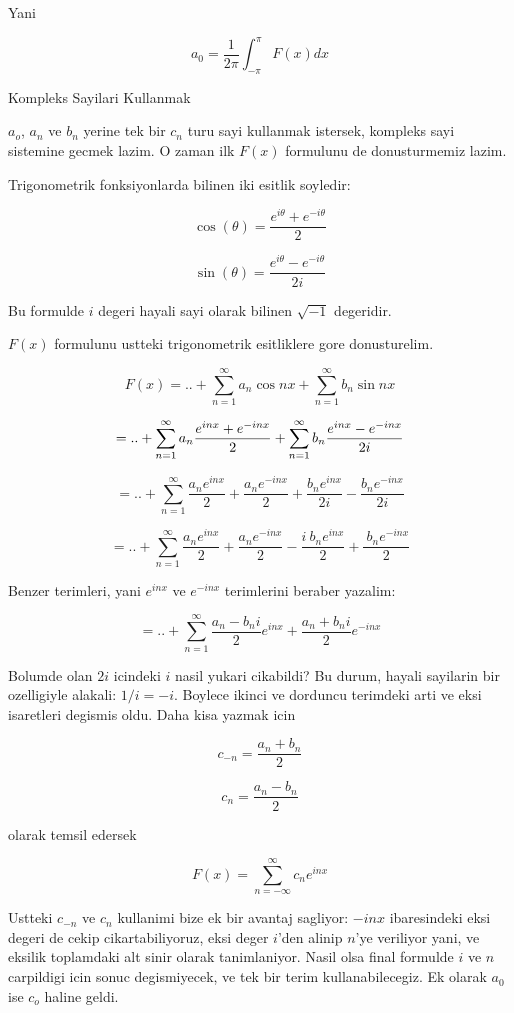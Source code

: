\documentclass[12pt,fleqn]{article}\usepackage{../common}
\begin{document}
Yani

\[ a_0 = \frac{1}{2\pi}\int_{-\pi}^{\pi}F(x)dx \]

Kompleks Sayilari Kullanmak

$a_o$, $a_n$ ve $b_n$ yerine tek bir $c_n$ turu sayi kullanmak istersek,
kompleks sayi sistemine gecmek lazim. O zaman ilk $F(x)$ formulunu de
donusturmemiz lazim.

Trigonometrik fonksiyonlarda bilinen iki esitlik soyledir:

\[ \cos(\theta) = \frac{e^{i\theta}+e^{-i\theta}}{2} \]

\[ \sin(\theta) = \frac{e^{i\theta}-e^{-i\theta}}{2i}  \]

Bu formulde $i$ degeri hayali sayi olarak bilinen $\sqrt{-1}$ degeridir. 

$F(x)$ formulunu ustteki trigonometrik esitliklere gore donusturelim. 

\[ F(x) = .. +  \sum_{n=1}^{\infty}a_n \cos nx + \sum_{n=1}^{\infty}b_n \sin nx \]

\[ = .. + \sum_{n=1}^{\infty} a_n \frac{e^{inx} + e^{-inx}}{2} +  \sum_{n=1}^{\infty} b_n \frac{e^{inx} - e^{-inx}}{2i}\\ \]

\[ = .. + \sum_{n=1}^{\infty} \frac{a_ne^{inx}}{2} + \frac{a_ne^{-inx}}{2} +
\frac{b_ne^{inx}}{2i} - \frac{b_ne^{-inx}}{2i} \]

\[ = .. + \sum_{n=1}^{\infty} \frac{a_ne^{inx}}{2} + \frac{a_ne^{-inx}}{2} -
\frac{i \ b_ne^{inx}}{2} + \frac{ \ b_ne^{-inx}}{2} \]

Benzer terimleri, yani $e^{inx}$ ve $e^{-inx}$ terimlerini beraber yazalim:

\[ = .. + \sum_{n=1}^{\infty} \frac{a_n-b_ni}{2}e^{inx} + \frac{a_n+b_ni}{2}e^{-inx} \]

Bolumde olan $2i$ icindeki $i$ nasil yukari cikabildi? Bu durum, hayali
sayilarin bir ozelligiyle alakali: $1/i = -i$. Boylece ikinci ve dorduncu
terimdeki arti ve eksi isaretleri degismis oldu. Daha kisa yazmak icin

\[ c_{-n} = \frac{a_n + b_n}{2} \]

\[ c_{n} = \frac{a_n - b_n}{2} \]

olarak temsil edersek

\begin{equation} F(x) = \sum_{n=-\infty}^{\infty} c_ne^{inx} \label{complexfourier} \end{equation}

Ustteki $c_{-n}$ ve $c_n$ kullanimi bize ek bir avantaj sagliyor: $-inx$
ibaresindeki eksi degeri de cekip cikartabiliyoruz, eksi deger $i$'den alinip
$n$'ye veriliyor yani, ve eksilik toplamdaki alt sinir olarak
tanimlaniyor. Nasil olsa final formulde $i$ ve $n$ carpildigi icin sonuc
degismiyecek, ve tek bir terim kullanabilecegiz. Ek olarak $a_0$ ise $c_o$
haline geldi.
\end{document}
